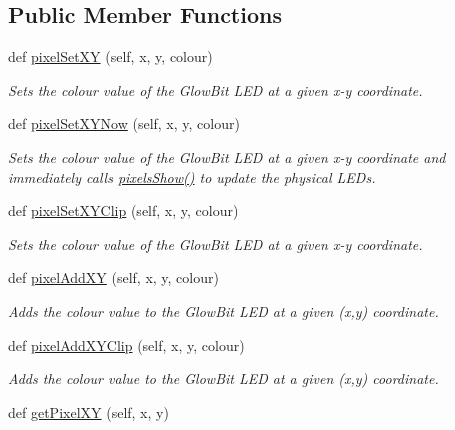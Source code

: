 \subsection*{Public Member Functions}
\begin{DoxyCompactItemize}
\item 
def \hyperlink{classglowbit_1_1glowbitMatrix_a5f20884e1b08bc66e54860d0bbf0d22e}{pixel\+Set\+XY} (self, x, y, colour)
\begin{DoxyCompactList}\small\item\em Sets the colour value of the Glow\+Bit L\+ED at a given x-\/y coordinate. \end{DoxyCompactList}\item 
def \hyperlink{classglowbit_1_1glowbitMatrix_ab100bb891bab3d6479b066049ce9a367}{pixel\+Set\+X\+Y\+Now} (self, x, y, colour)
\begin{DoxyCompactList}\small\item\em Sets the colour value of the Glow\+Bit L\+ED at a given x-\/y coordinate and immediately calls \hyperlink{classglowbit_1_1glowbit_a051aed2a4969fdcb0466e4e840209279}{pixels\+Show()} to update the physical L\+E\+Ds. \end{DoxyCompactList}\item 
def \hyperlink{classglowbit_1_1glowbitMatrix_af33f1952a94e2f0933386ae2e7c5bca4}{pixel\+Set\+X\+Y\+Clip} (self, x, y, colour)
\begin{DoxyCompactList}\small\item\em Sets the colour value of the Glow\+Bit L\+ED at a given x-\/y coordinate. \end{DoxyCompactList}\item 
def \hyperlink{classglowbit_1_1glowbitMatrix_ae05d008c207c5f5219e737d29185501e}{pixel\+Add\+XY} (self, x, y, colour)
\begin{DoxyCompactList}\small\item\em Adds the colour value to the Glow\+Bit L\+ED at a given (x,y) coordinate. \end{DoxyCompactList}\item 
def \hyperlink{classglowbit_1_1glowbitMatrix_a4f2deb5f58f45e285e84c9cac1644618}{pixel\+Add\+X\+Y\+Clip} (self, x, y, colour)
\begin{DoxyCompactList}\small\item\em Adds the colour value to the Glow\+Bit L\+ED at a given (x,y) coordinate. \end{DoxyCompactList}\item 
def \hyperlink{classglowbit_1_1glowbitMatrix_ab67885d63f392afa061c8455de3e31ba}{get\+Pixel\+XY} (self, x, y)

\end{DoxyCompactItemize}
